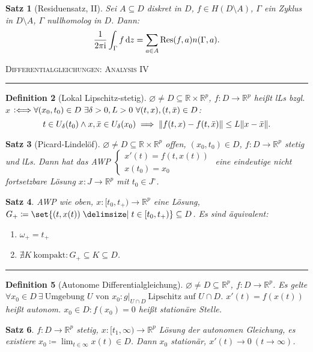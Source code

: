\documentclass[a4paper]{article}
\newcounter{Sec}
\theoremstyle{marginbreak}
\newtheorem{definition}{Definition}[Sec]
\newtheorem{satz}[definition]{Satz}
\newcommand{\sep}{%
	\rule{\textwidth}{0.3pt}%
	\stepcounter{Sec}%
	}
\newcommand{\defiff}{\mathrel{\vcentcolon\Longleftrightarrow}}
\newcommand{\R}{\mathbb{R}}
\renewcommand{\i}{\mathrm{i}}
\begin{document}
	\begin{satz}[Residuensatz, II]
		Sei $A\subseteq D$ diskret in $D$, $f\in H(D\setminus A)$, $\Gamma$ ein Zyklus in $D\setminus A$,
		$\Gamma$ nullhomolog in $D$. Dann:
		\[
			\frac{1}{2\pi\i}\int_\Gamma f\dd{z}=\sum_{a\in A}\Res(f, a)n(\Gamma, a).
		\]
	\end{satz}
	\newpage
	\textsc{Differentialgleichungen: Analysis IV}

	\sep
	\begin{definition}[Lokal Lipschitz-stetig]
		$\varnothing\neq D\subseteq \R\times\R^p$, $f\colon D\to\R^p$ heißt lLs bzgl. $x$
		$\defiff\forall(x_0, t_0)\in D~\exists\delta>0, L>0~\forall (t, x), (t, \bar{x})\in D$:
		\[
			t\in U_\delta(t_0)\wedge x, \bar{x}\in U_\delta(x_0)\implies\norm{f(t, x)-f(t, \bar{x})}\leq L\norm{x-\bar{x}}.
		\]
	\end{definition}
	\begin{satz}[Picard-Lindelöf]
		$\varnothing\neq D\subseteq\R\times\R^p$ offen, $(x_0, t_0)\in D$, $f\colon D\to\R^p$
		stetig und lLs. Dann hat das AWP $\begin{cases}x'(t)=f(t, x(t))\\x(t_0)=x_0\end{cases}$
		eine eindeutige nicht fortsetzbare Lösung $x\colon J\to\R^p$ mit $t_0\in J^\circ$.
	\end{satz}
	\begin{satz}
		AWP wie oben, $x\colon [t_0,t_+)\to\R^p$ eine Lösung, $G_+\coloneqq\set{(t, x(t))\given t\in[t_0,t_+)}\subseteq D$.
		Es sind äquivalent:
		\begin{enumerate}[label=(\alph*)]
			\item $\omega_+=t_+$
			\item $\nexists K~\text{kompakt}: G_+\subseteq K\subseteq D$.
		\end{enumerate}
	\end{satz}
	\sep
	\begin{definition}[Autonome Differentialgleichung]
		$\varnothing\neq D\subseteq \R^p$, $f\colon D\to\R^p$. Es gelte $\forall x_0\in D~\exists~\text{Umgebung $U$ von $x_0$}: g|_{U\cap D}
		~\text{Lipschitz auf $U\cap D$}$.
		$x'(t)=f(x(t))$ heißt autonom. $x_0\in D: f(x_0)=0$ heißt
		stationäre Stelle.
	\end{definition}
	\begin{satz}
		$f\colon D\to\R^p$ stetig, $x\colon [t_1,\infty)\to\R^p$ Lösung der autonomen Gleichung,
		es existiere $x_0\coloneqq\lim_{t\in\infty}x(t)\in D$. Dann $x_0$ stationär, $x'(t)\to 0~(t\to\infty)$.
	\end{satz}
\end{document}
